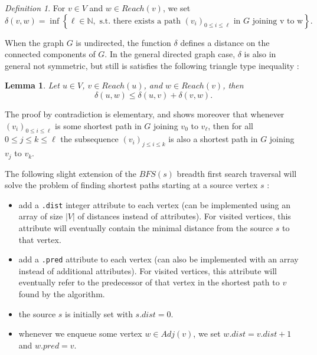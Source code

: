 \documentclass[12pt]{article}
\theoremstyle{plain}
\newtheorem{lemma}{Lemma}
\theoremstyle{remark}
\newtheorem*{definition}{Definition}
\newcommand{\N}{\mathbb{N}}
\begin{document}
\begin{definition}
For $v \in V$ and $w \in Reach(v)$, we set
$$
	\delta(v, w) = \inf\left\{ \ell \in \N, \text{ s.t. there exists a path
	} (v_i)_{0\leq i \leq \ell} \text{ in } G \text{ joining  v to
	w}\right\}.
$$
\end{definition}

When the graph $G$ is undirected, the function $\delta$ defines a distance on
the connected components of $G$. In the general directed graph case, $\delta$ is 
also in general not symmetric, but still is satisfies the following triangle
type inequality : 

\begin{lemma}\label{lem:trineq}
	Let $u \in V$, $v \in Reach(u)$, and $w \in Reach(v)$, then 
	$$
	\delta(u,w) \leq \delta(u,v) + \delta(v,w).
	$$
\end{lemma}

The proof by contradiction is elementary, and shows moreover that whenever 
$(v_i)_{0\leq i \leq \ell}$ is some shortest path in $G$ joining $v_0$ to
$v_{\ell}$, then for all $0\leq j \leq k \leq \ell$ the subsequence 
$(v_i)_{j \leq i \leq k}$ is also a shortest path in $G$ joining $v_j$ 
to $v_k$. 

\medskip

The following slight extension of the $BFS(s)$ breadth first search traversal 
will solve the problem of finding shortest paths starting at a source vertex $s$ :
\begin{itemize}
	\item add a {\tt .dist} integer attribute to each vertex (can be
		implemented using an array of size $|V|$ of distances instead of
		attributes). 
		For visited vertices, this attribute will eventually 
		contain the minimal distance from the source $s$ to that vertex.
	\item add a {\tt .pred} attribute to each vertex (can also be
		implemented with an array instead of additional attributes). For
		visited vertices, this attribute will eventually refer to the
		predecessor of that vertex in the shortest path to $v$ found by
		the algorithm.
	\item the source $s$ is initially set with $s.dist = 0$.  
	\item whenever we enqueue some vertex $w \in Adj(v)$, we set $w.dist =
		v.dist + 1$ and $w.pred = v.$
\end{itemize}
\end{document}
